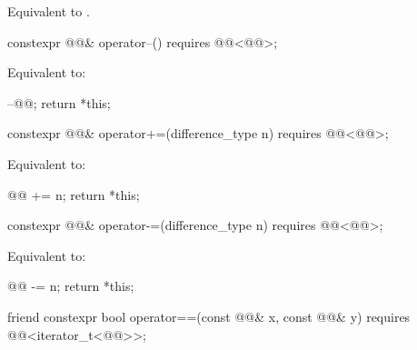 \begin{itemdescr}
\pnum
\effects
Equivalent to .
\end{itemdescr}

%
\begin{itemdecl}
constexpr @@& operator--() requires @@<@@>;
\end{itemdecl}

\begin{itemdescr}
\pnum
\effects
Equivalent to:
\begin{codeblock}
--@@;
return *this;
\end{codeblock}
\end{itemdescr}

%
\begin{itemdecl}
constexpr @@& operator+=(difference_type n)
  requires @@<@@>;
\end{itemdecl}

\begin{itemdescr}
\pnum
\effects
Equivalent to:
\begin{codeblock}
@@ += n;
return *this;
\end{codeblock}
\end{itemdescr}

%
\begin{itemdecl}
constexpr @@& operator-=(difference_type n)
  requires @@<@@>;
\end{itemdecl}

\begin{itemdescr}
\pnum
\effects
Equivalent to:
\begin{codeblock}
@@ -= n;
return *this;
\end{codeblock}
\end{itemdescr}

%
\begin{itemdecl}
friend constexpr bool operator==(const @@& x, const @@& y)
  requires @@<iterator_t<@@>>;
\end{itemdecl}

